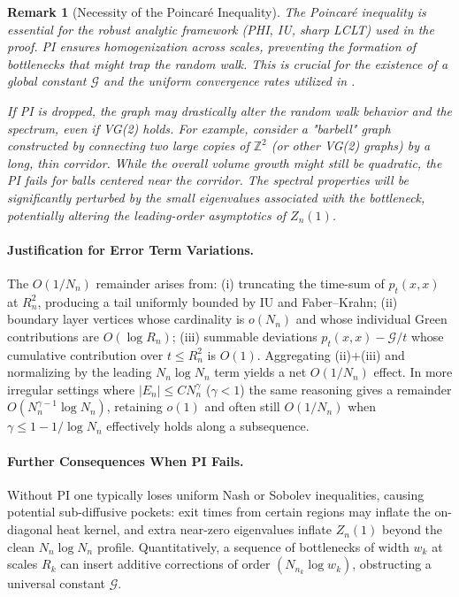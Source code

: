 \documentclass[11pt]{article}
\numberwithin{equation}{section}
\newtheorem{remark}[theorem]{Remark}
\newcommand{\cG}{\mathcal{G}}
\begin{document}
\begin{remark}[Necessity of the Poincaré Inequality]
The Poincaré inequality is essential for the robust analytic framework (PHI, IU, sharp LCLT) used in the proof. PI ensures homogenization across scales, preventing the formation of bottlenecks that might trap the random walk. This is crucial for the existence of a global constant $\cG$ and the uniform convergence rates utilized in .

If PI is dropped, the graph may drastically alter the random walk behavior and the spectrum, even if VG(2) holds. For example, consider a "barbell" graph constructed by connecting two large copies of $\mathbb{Z}^2$ (or other VG(2) graphs) by a long, thin corridor. While the overall volume growth might still be quadratic, the PI fails for balls centered near the corridor. The spectral properties will be significantly perturbed by the small eigenvalues associated with the bottleneck, potentially altering the leading-order asymptotics of $Z_n(1)$.
\end{remark}

\paragraph{Justification for Error Term Variations.} The $O(1/N_n)$ remainder arises from: (i) truncating the time-sum of $p_t(x,x)$ at $R_n^2$, producing a tail uniformly bounded by IU and Faber--Krahn; (ii) boundary layer vertices whose cardinality is $o(N_n)$ and whose individual Green contributions are $O(\log R_n)$; (iii) summable deviations $p_t(x,x)-\cG/t$ whose cumulative contribution over $t\le R_n^2$ is $O(1)$. Aggregating (ii)+(iii) and normalizing by the leading $N_n \log N_n$ term yields a net $O(1/N_n)$ effect. In more irregular settings where $|E_n|\le C N_n^{\gamma}$ ($\gamma<1$) the same reasoning gives a remainder $O(N_n^{\gamma-1} \log N_n)$, retaining $o(1)$ and often still $O(1/N_n)$ when $\gamma\le 1-1/\log N_n$ effectively holds along a subsequence.

\paragraph{Further Consequences When PI Fails.} Without PI one typically loses uniform Nash or Sobolev inequalities, causing potential sub-diffusive pockets: exit times from certain regions may inflate the on-diagonal heat kernel, and extra near-zero eigenvalues inflate $Z_n(1)$ beyond the clean $N_n \log N_n$ profile. Quantitatively, a sequence of bottlenecks of width $w_k$ at scales $R_k$ can insert additive corrections of order $(N_{n_k} \log w_k)$, obstructing a universal constant $\cG$.
\end{document}
